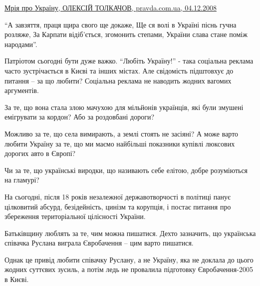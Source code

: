  
 
 
 
 

\href{https://www.pravda.com.ua/articles/2008/12/4/3627035/}{%
Мрія про Україну, ОЛЕКСІЙ ТОЛКАЧОВ, pravda.com.ua, 04.12.2008%
}

\begin{multicols}{2}

\begin{textQuote}
\obeycr
\enquote{А завзяття, праця щира свого ще докаже,
Ще ся волі в Україні піснь гучна розляже,
За Карпати відіб'ється, згомонить степами,
України слава стане поміж народами}.
\restorecr
\end{textQuote}


Патріотом сьогодні бути дуже важко. \enquote{Любіть Україну!} - така соціальна реклама
часто зустрічається в Києві та інших містах. Але свідомість підштовхує до
питання – за що любити? Соціальна реклама не наводить жодних вагомих
аргументів.


За те, що вона стала злою мачухою для мільйонів українців, які були змушені
емігрувати за кордон? Або за роздовбані дороги?

Можливо за те, що села вимирають, а землі стоять не засіяні? А може варто
любити Україну за те, що ми маємо найбільші показники купівлі люксових дорогих
авто в Європі?

Чи за те, що українські виродки, що називають себе елітою, добре розуміються на
гламурі?

На сьогодні, після 18 років незалежної державотворчості в політиці панує
цілковитий абсурд, безідейність, цинізм та корупція, і постає питання про
збереження територіальної цілісності України.

Батьківщину люблять за те, чим можна пишатися. Дехто зазначить, що українська
співачка Руслана виграла Євробачення – цим варто пишатися.

Однак це привід любити співачку Руслану, а не Україну, яка не доклала до цього
жодних суттєвих зусиль, а потім ледь не провалила підготовку Євробачення-2005 в
Києві.


\end{multicols}

